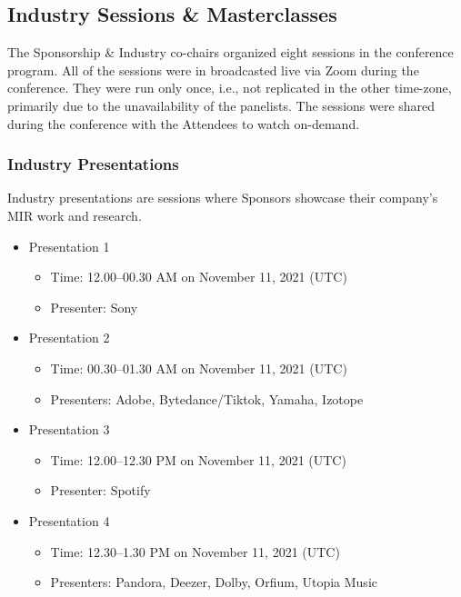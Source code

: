 \documentclass[%
10pt,								%
titlepage,						%
]
{scrartcl}
\begin{document}
    \subsection{Industry Sessions \& Masterclasses}\label{sec:industrysessions}
        The Sponsorship \& Industry co-chairs organized eight sessions in the conference program. All of the sessions were in broadcasted live via Zoom during the conference. They were run only once, i.e., not replicated in the other time-zone, primarily due to the unavailability of the panelists. The sessions were shared during the conference with the Attendees to watch on-demand.
        
        \subsubsection{Industry Presentations}
            Industry presentations are sessions where Sponsors showcase their company's MIR work and research.
            \begin{itemize}
                \item Presentation 1
                    \begin{itemize}
                        \item Time: 12.00--00.30 AM on November 11, 2021 (UTC)
                        \item   Presenter: Sony
                    \end{itemize}
                \item Presentation 2
                    \begin{itemize}
                        \item Time: 00.30--01.30 AM on November 11, 2021 (UTC)
                        \item   Presenters: Adobe, Bytedance/Tiktok, Yamaha, Izotope
                    \end{itemize}
                \item Presentation 3
                    \begin{itemize}
                        \item Time: 12.00--12.30 PM on November 11, 2021 (UTC)
                        \item   Presenter: Spotify
                    \end{itemize}
                \item Presentation 4
                    \begin{itemize}
                        \item Time: 12.30--1.30 PM on November 11, 2021 (UTC)
                        \item  Presenters: Pandora, Deezer, Dolby, Orfium, Utopia Music 
                    \end{itemize}
            \end{itemize}
\end{document}
